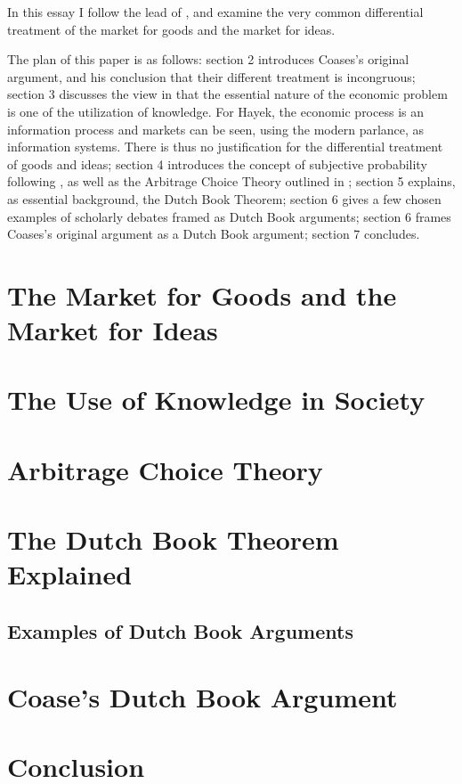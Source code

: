 \documentclass[11pt,]{article}
\begin{document}
In this essay I follow the lead of \citet{Coase1974}, and examine the
very common differential treatment of the market for goods and the
market for ideas.

The plan of this paper is as follows: section 2 introduces Coases's
original argument, and his conclusion that their different treatment is
incongruous; section 3 discusses the view in \citet{Hayek1945} that the
essential nature of the economic problem is one of the utilization of
knowledge. For Hayek, the economic process is an information process and
markets can be seen, using the modern parlance, as information systems.
There is thus no justification for the differential treatment of goods
and ideas; section 4 introduces the concept of subjective probability
following \citet{deFinetti1937}, as well as the Arbitrage Choice Theory
outlined in \citet{Nau1999}; section 5 explains, as essential
background, the Dutch Book Theorem; section 6 gives a few chosen
examples of scholarly debates framed as Dutch Book arguments; section 6
frames Coases's original argument as a Dutch Book argument; section 7
concludes.

\section{The Market for Goods and the Market for
Ideas}\label{the-market-for-goods-and-the-market-for-ideas}

\section{The Use of Knowledge in
Society}\label{the-use-of-knowledge-in-society}

\section{Arbitrage Choice Theory}\label{arbitrage-choice-theory}

\section{The Dutch Book Theorem
Explained}\label{the-dutch-book-theorem-explained}

\subsection{Examples of Dutch Book
Arguments}\label{examples-of-dutch-book-arguments}

\section{Coase's Dutch Book Argument}\label{coases-dutch-book-argument}

\section{Conclusion}\label{conclusion}

\newpage
\singlespacing 

\end{document}

